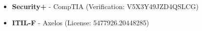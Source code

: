 \begin{itemize}
	\item[] {\bf Security+} - CompTIA (Verification:  V5X3Y49JZD4QSLCG)
	\item[] {\bf ITIL-F} - Axelos (License: 5477926.20448285)
\end{itemize}